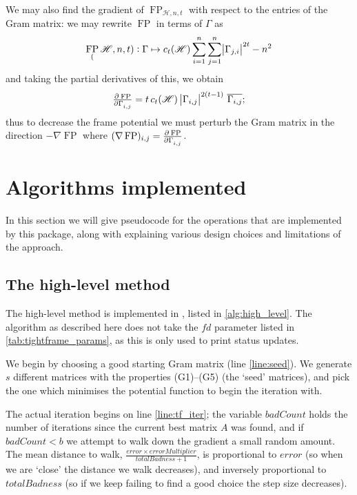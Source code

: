 \documentclass{article}
\newcommand{\scrH}{\mathscr{H}}
\DeclareMathOperator{\FP}{FP}
\theoremstyle{definition}
\begin{document}
  We may also find the gradient of $ \FP_{\scrH,n,t} $ with respect to the entries of the Gram
  matrix: we may rewrite $ \FP $ in terms of $ \Gamma $ as
  \begin{displaymath}
    \FP_(\scrH,n,t) : \Gamma \mapsto c_t(\scrH) \sum_{i = 1}^n \sum_{j = 1}^n \abs{\Gamma_{j,i}}^{2t} - n^2
  \end{displaymath}
  and taking the partial derivatives of this, we obtain
  \begin{displaymath}
    \pd{\FP}{\Gamma_{i,j}} = t\thinspace c_t(\scrH)\thinspace \abs{\Gamma_{i,j}}^{2(t-1)} \thinspace \overline{\Gamma_{i,j}};
  \end{displaymath}
  thus to decrease the frame potential we must perturb the Gram matrix in the direction $ -\nabla \FP $
  where $ (\nabla \FP)_{i,j} = \pd{\FP}{\Gamma_{i,j}} $.

  \section{Algorithms implemented}
  In this section we will give pseudocode for the operations that are implemented by this
  package, along with explaining various design choices and limitations of the approach.

  \subsection{The high-level method}
  The high-level method is implemented in , listed in \cref{alg:high_level}.
  The algorithm as described here does not take the $ fd $ parameter listed in \cref{tab:tightframe_params},
  as this is only used to print status updates.

  We begin by choosing a good starting Gram matrix (line \ref{line:seed}). We generate $ s $ different matrices
  with the properties (G1)--(G5) (the `seed' matrices), and pick the one which minimises the potential function
  to begin the iteration with.

  The actual iteration begins on line \ref{line:tf_iter}; the variable $ badCount $ holds the number of iterations
  since the current best matrix $ A $ was found, and if $ badCount < b $ we attempt to walk down the gradient
  a small random amount. The mean distance to walk, $ \frac{error \times errorMultiplier}{totalBadness + 1} $,
  is proportional to $ error $ (so when we are `close' the distance we walk decreases), and inversely proportional
  to $ totalBadness $ (so if we keep failing to find a good choice the step size decreases).
\end{document}

